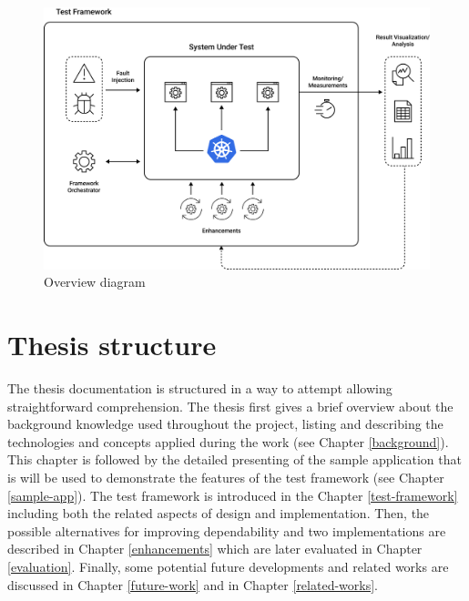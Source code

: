 \begin{figure}[H]
	\centering
	\includegraphics[width=140mm, keepaspectratio]{figures/overview-diagram.png}
	\caption{Overview diagram}
	\label{fig:overview}
\end{figure}

\section{Thesis structure}

The thesis documentation is structured in a way to attempt allowing straightforward comprehension. The thesis first gives a brief overview about the background knowledge used throughout the project, listing and describing the technologies and concepts applied during the work (see Chapter \ref{background}). This chapter is followed by the detailed presenting of the sample application that is will be used to demonstrate the features of the test framework (see Chapter \ref{sample-app}). The test framework is introduced in the Chapter \ref{test-framework} including both the related aspects of design and implementation. Then, the possible alternatives for improving dependability and two implementations are described in Chapter \ref{enhancements} which are later evaluated in Chapter \ref{evaluation}. Finally, some potential future developments and related works are discussed in Chapter \ref{future-work} and in Chapter \ref{related-works}.

